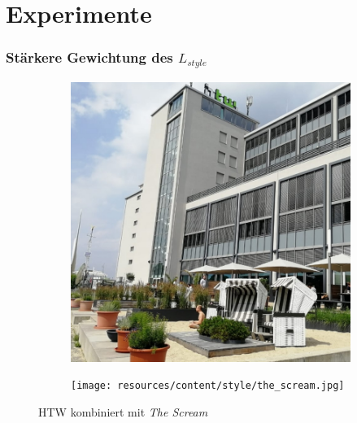 \section{Experimente}

\begin{frame}
    \frametitle{Stärkere Gewichtung des $ L_{style} $}

    \begin{figure}[H]
        \centering
        \begin{subfigure}[h]{0.49\textwidth}
            \centering
            \includegraphics[width=\textwidth]{resources/content/content/htw-768x768.jpg}
        \end{subfigure}
        \begin{subfigure}[h]{0.49\textwidth}
            \centering
            \texttt{[image: resources/content/style/the\_scream.jpg]}
        \end{subfigure}
        \caption{HTW kombiniert mit \textit{The Scream} \cite{the_scream_img}}
    \end{figure}
\end{frame}

